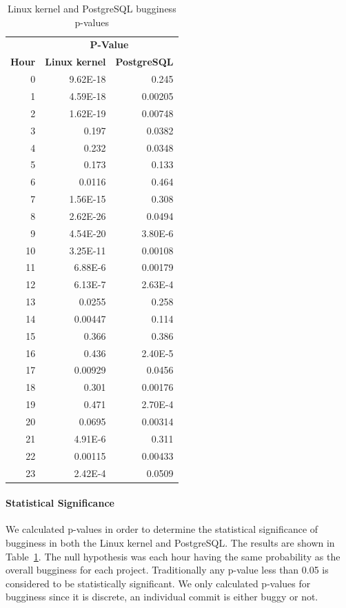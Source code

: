\begin{table}
\begin{center}
\begin{tabular}{r|r|r}
\multicolumn{1}{c}{} & \multicolumn{2}{c}{{\bf P-Value}} \\
\multicolumn{1}{c|}{{\bf Hour}} & \multicolumn{1}{c|}{{\bf Linux kernel}} &
\multicolumn{1}{c}{{\bf PostgreSQL}} \\
\hline
0  & 9.62E-18 & 0.245   \\
1  & 4.59E-18 & 0.00205 \\
2  & 1.62E-19 & 0.00748 \\
3  & 0.197    & 0.0382  \\
4  & 0.232    & 0.0348  \\
5  & 0.173    & 0.133   \\
6  & 0.0116   & 0.464   \\
7  & 1.56E-15 & 0.308   \\
8  & 2.62E-26 & 0.0494  \\
9  & 4.54E-20 & 3.80E-6 \\
10 & 3.25E-11 & 0.00108 \\
11 & 6.88E-6  & 0.00179 \\
12 & 6.13E-7  & 2.63E-4 \\
13 & 0.0255   & 0.258   \\
14 & 0.00447  & 0.114   \\
15 & 0.366    & 0.386   \\
16 & 0.436    & 2.40E-5 \\
17 & 0.00929  & 0.0456  \\
18 & 0.301    & 0.00176 \\
19 & 0.471    & 2.70E-4 \\
20 & 0.0695   & 0.00314 \\
21 & 4.91E-6  & 0.311   \\
22 & 0.00115  & 0.00433 \\
23 & 2.42E-4  & 0.0509  \\
\end{tabular}
\end{center}
\caption{\label{tbl-pvalues}Linux kernel and PostgreSQL bugginess p-values}
\end{table}

\paragraph{Statistical Significance}

We calculated p-values in order to determine the statistical significance of
bugginess in both the Linux kernel and PostgreSQL. The results are shown in
Table~\ref{tbl-pvalues}. The null hypothesis was each hour having the same
probability as the overall bugginess for each project. Traditionally any p-value
less than 0.05 is considered to be statistically significant. We only calculated
p-values for bugginess since it is discrete, an individual commit is either
buggy or not.


